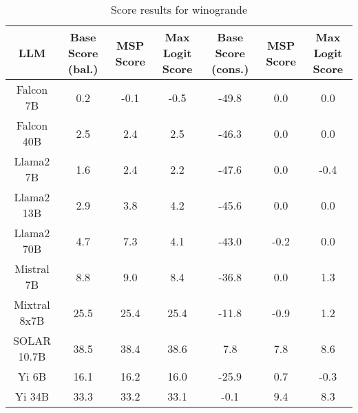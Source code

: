 \renewcommand\arraystretch{1.2}
\begin{table*}
\centering
\begin{tabular}{c|c|c|c|c|c|c}
LLM & Base Score (bal.) & MSP Score & Max Logit Score & Base Score (cons.) & MSP Score & Max Logit Score\\ \hline
Falcon 7B & 0.2 & -0.1 & -0.5 & -49.8 & 0.0 & 0.0\\
Falcon 40B & 2.5 & 2.4 & 2.5 & -46.3 & 0.0 & 0.0\\
Llama2 7B & 1.6 & 2.4 & 2.2 & -47.6 & 0.0 & -0.4\\
Llama2 13B & 2.9 & 3.8 & 4.2 & -45.6 & 0.0 & 0.0\\
Llama2 70B & 4.7 & 7.3 & 4.1 & -43.0 & -0.2 & 0.0\\
Mistral 7B & 8.8 & 9.0 & 8.4 & -36.8 & 0.0 & 1.3\\
Mixtral 8x7B & 25.5 & 25.4 & 25.4 & -11.8 & -0.9 & 1.2\\
SOLAR 10.7B & 38.5 & 38.4 & 38.6 & 7.8 & 7.8 & 8.6\\
Yi 6B & 16.1 & 16.2 & 16.0 & -25.9 & 0.7 & -0.3\\
Yi 34B & 33.3 & 33.2 & 33.1 & -0.1 & 9.4 & 8.3\\
\hline
\end{tabular}
\caption{Score results for winogrande}
\end{table*}
\label{tab:winogrande_score}
